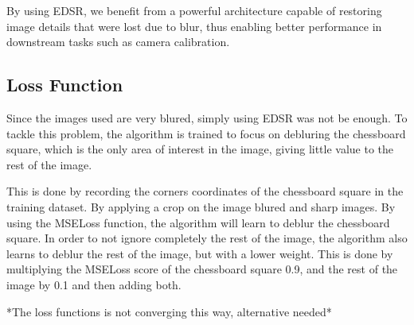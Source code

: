 By using EDSR, we benefit from a powerful architecture capable of restoring image details that were lost due to blur, thus enabling better 
performance in downstream tasks such as camera calibration.

\subsection{Loss Function}

Since the images used are very blured, simply using EDSR was not be enough. To tackle this problem,
the algorithm is trained to focus on debluring the chessboard square, which is the only area of interest in the image, giving
little value to the rest of the image. 

This is done by recording the corners coordinates of the chessboard square in the training dataset. By applying a crop on the image blured and 
sharp images. By using the MSELoss function, the algorithm will learn to deblur the chessboard square. In order to not ignore completely
the rest of the image, the algorithm also learns to deblur the rest of the image, but with a lower weight. This is done
by multiplying the MSELoss score of the chessboard square 0.9, and the rest of the image by 0.1 and then adding both.

*The loss functions is not converging this way, alternative needed*



